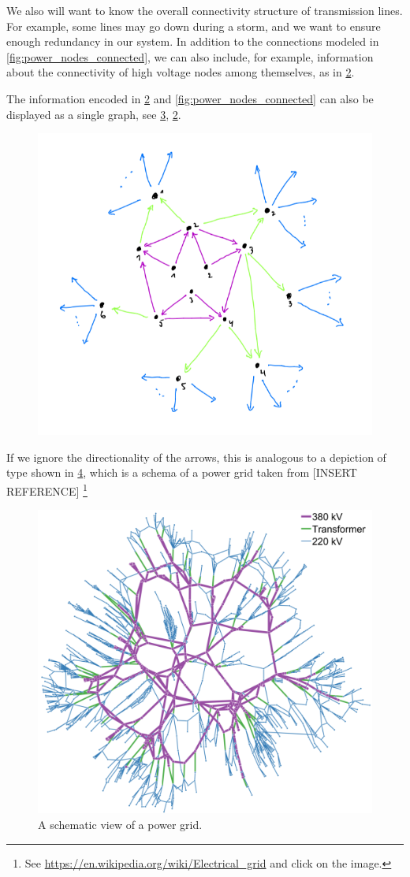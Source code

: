 \begin{figure}[h!]
\centering
{}
 \caption{}
\label{fig:power_paths}
\end{figure}


We also will want to know the overall connectivity structure of transmission lines. For example, some lines may go down during a storm, and we want to ensure enough redundancy in our system. In addition to the connections modeled in \cref{fig:power_nodes_connected}, we can also include, for example, information about the connectivity of high voltage nodes among themselves, as in \cref{fig:power_internodal}. 

\begin{figure}[h!]
\centering
 \caption{}
\label{fig:power_internodal}
\end{figure}
The information encoded in \cref{fig:power_internodal} and \cref{fig:power_nodes_connected} can also be displayed as a single graph, see \cref{fig:power_graph},
\cref{fig:power_internodal}. 
\begin{figure}[h!]
\centering
 \includegraphics[width=0.5\linewidth]{pics/dist_net_6.png} 
 \caption{}
\label{fig:power_graph}
\end{figure}
If we ignore the directionality of the arrows, this is analogous to a depiction of type shown in \cref{fig:power_schema}, which is a schema of a power grid taken from [INSERT REFERENCE] \footnote{See \url{https://en.wikipedia.org/wiki/Electrical_grid} and click on the image.} 

\begin{figure}[h!]
\centering
 \includegraphics[width=0.5\linewidth]{pics/power_dist_network.png}
 \caption{A schematic view of a power grid.}
\label{fig:power_schema}
\end{figure}


